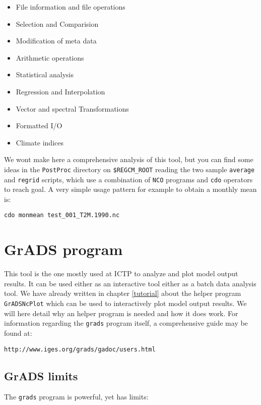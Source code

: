 \begin{itemize}
\item File information and file operations
\item Selection and Comparision
\item Modification of meta data
\item Arithmetic operations
\item Statistical analysis
\item Regression and Interpolation
\item Vector and spectral Transformations
\item Formatted I/O
\item Climate indices
\end{itemize}

We wont make here a comprehensive analysis of this tool, but you can
find some ideas in the \verb=PostProc= directory on \verb=$REGCM_ROOT= reading
the two sample \verb=average= and \verb=regrid= scripts, which use a combination
of \verb=NCO= programs and \verb=cdo= operators to reach goal.
A very simple usage pattern for example to obtain a monthly mean is:

\begin{Verbatim}
cdo monmean test_001_T2M.1990.nc
\end{Verbatim}

\section{GrADS program}

This tool is the one mostly used at ICTP to analyze and plot model output
results. It can be used either as an interactive tool either as a batch
data analysis tool. We have already written in chapter \ref{tutorial} about
the helper program \verb=GrADSNcPlot= which can be used to interactively
plot model output results. We will here detail why an helper program is
needed and how it does work. For information regarding the \verb=grads=
program itself, a comprehensive guide may be found at:

\begin{Verbatim}
http://www.iges.org/grads/gadoc/users.html
\end{Verbatim}

\subsection{GrADS limits}

The \verb=grads= program is powerful, yet has limits:


